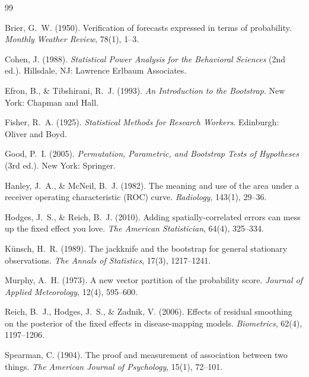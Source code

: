 \begin{thebibliography}{99}

Brier, G.~W. (1950).
\newblock Verification of forecasts expressed in terms of probability.
\newblock \emph{Monthly Weather Review}, 78(1), 1--3.

Cohen, J. (1988).
\newblock \emph{Statistical Power Analysis for the Behavioral Sciences} (2nd ed.).
\newblock Hillsdale, NJ: Lawrence Erlbaum Associates.

Efron, B., \& Tibshirani, R.~J. (1993).
\newblock \emph{An Introduction to the Bootstrap}.
\newblock New York: Chapman and Hall.

Fisher, R.~A. (1925).
\newblock \emph{Statistical Methods for Research Workers}.
\newblock Edinburgh: Oliver and Boyd.

Good, P.~I. (2005).
\newblock \emph{Permutation, Parametric, and Bootstrap Tests of Hypotheses} (3rd ed.).
\newblock New York: Springer.

Hanley, J.~A., \& McNeil, B.~J. (1982).
\newblock The meaning and use of the area under a receiver operating characteristic (ROC) curve.
\newblock \emph{Radiology}, 143(1), 29--36.

Hodges, J.~S., \& Reich, B.~J. (2010).
\newblock Adding spatially-correlated errors can mess up the fixed effect you love.
\newblock \emph{The American Statistician}, 64(4), 325--334.

K\"{u}nsch, H.~R. (1989).
\newblock The jackknife and the bootstrap for general stationary observations.
\newblock \emph{The Annals of Statistics}, 17(3), 1217--1241.

Murphy, A.~H. (1973).
\newblock A new vector partition of the probability score.
\newblock \emph{Journal of Applied Meteorology}, 12(4), 595--600.

Reich, B.~J., Hodges, J.~S., \& Zadnik, V. (2006).
\newblock Effects of residual smoothing on the posterior of the fixed effects in disease-mapping models.
\newblock \emph{Biometrics}, 62(4), 1197--1206.

Spearman, C. (1904).
\newblock The proof and measurement of association between two things.
\newblock \emph{The American Journal of Psychology}, 15(1), 72--101.

\end{thebibliography}

